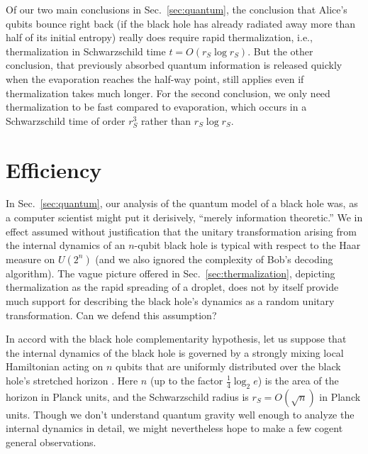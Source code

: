\documentclass[12pt]{article}
\begin{document}
Of our two main conclusions in Sec.~\ref{sec:quantum}, the conclusion that Alice's qubits bounce right back (if the black hole has already radiated away more than half of its initial entropy) really does require rapid thermalization, i.e., thermalization in Schwarzschild time $t=O(r_S\log r_S)$. But the other conclusion, that previously absorbed quantum information is released quickly when the evaporation reaches the half-way point, still applies even if thermalization takes much longer. For the second conclusion, we only need thermalization to be fast compared to evaporation, which occurs in a Schwarzschild time of order $r_S^3$ rather than $r_S\log r_S$.

\section{Efficiency}
\label{sec:efficiency}

In Sec.~\ref{sec:quantum}, our analysis of the quantum model of a black hole was, as a computer scientist might put it derisively, ``merely information theoretic.'' We in effect assumed without justification that the unitary transformation arising from the internal dynamics of an $n$-qubit black hole is typical with respect to the Haar measure on $U(2^n)$ (and we also ignored the complexity of Bob's decoding algorithm). The vague picture offered in Sec.~\ref{sec:thermalization}, depicting thermalization as the rapid spreading of a droplet, does not by itself provide much support for describing the black hole's dynamics as a random unitary transformation. Can we defend this assumption?

In accord with the black hole complementarity hypothesis, let us suppose that the internal dynamics of the black hole is governed by a strongly mixing local Hamiltonian acting on $n$ qubits that are uniformly distributed over the black hole's stretched horizon \cite{complement,susskind-book}. Here $n$ (up to the factor $\frac{1}{4}\log_2 e$) is the area of the horizon in Planck units, and the Schwarzschild radius is $r_S=O(\sqrt{n})$ in Planck units. Though we don't understand quantum gravity well enough to analyze the internal dynamics in detail,  we might nevertheless hope to make a few cogent general observations.
\end{document}
